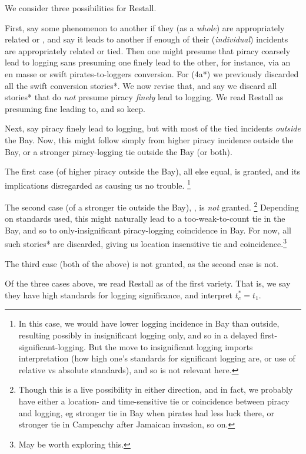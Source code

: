 		We consider three possibilities for Restall. 
		
		First, say some phenomenon  to another  if they (as a \emph{whole}) are appropriately related or , and say it leads to another  if enough of their (\emph{individual}) incidents are appropriately related or tied. Then one might presume that piracy coarsely lead to logging sans presuming one finely lead to the other, for instance, via an en masse or swift pirates-to-loggers conversion. For (4a*) we previously discarded all the swift conversion stories*. We now revise that, and say we discard all stories* that do \emph{not} presume piracy \emph{finely} lead to logging. We read Restall as presuming fine leading to, and so keep.
		
		Next, say piracy finely lead to logging, but with most of the tied incidents \emph{outside} the Bay. Now, this might follow simply from higher piracy incidence outside the Bay, or a stronger piracy-logging tie outside the Bay (or both).
		
		The first case (of higher piracy outside the Bay), all else equal, is granted, and its implications disregarded as causing us no trouble.
		\footnote{In this case, we would have lower logging incidence in Bay than outside, resulting possibly in insignificant logging only, and so in a delayed first-significant-logging. But the move to insignificant logging imports interpretation (how high one's standards for significant logging are, or use of relative vs absolute standards), and so is not relevant here.}
		
		The second case (of a stronger tie outside the Bay), , is \emph{not} granted.%
		\footnote{Though this is a live possibility in either direction, and in fact, we probably have either a location- and time-sensitive tie or coincidence between piracy and logging, eg stronger tie in Bay when pirates had less luck there, or stronger tie in Campeachy after Jamaican invasion, so on.}
		Depending on standards used, this might naturally lead to a too-weak-to-count tie in the Bay, and so to only-insignificant piracy-logging coincidence in Bay. For now, all such stories* are discarded, giving us location insensitive tie and coincidence.\footnote{May be worth exploring this.}
		
		The third case (both of the above) is not granted, as the second case is not.
		
		Of the three cases above, we read Restall as of the first variety. That is, we say they have high standards for logging significance, and interpret \(t_c^*=t_1\).
		
